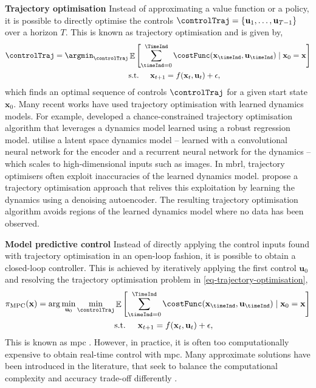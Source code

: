 \documentclass{mimosis-class/mimosis}
\numberwithin{equation}{chapter}
\DeclareMathOperator{\E}{\mathbb{E}}
\newcommand{\state}{\ensuremath{\mathbf{x}}}
\newcommand{\control}{\ensuremath{\mathbf{u}}}
\begin{document}
\textbf{Trajectory optimisation}
Instead of approximating a value function or a policy, it is possible to directly optimise the controls
\(\controlTraj = \{\control_1, \ldots, \control_{T-1} \}\) over a horizon \(T\).
This is known as trajectory optimisation and is given by,
\begin{subequations} \label{eq-trajectory-optimisation}
\begin{align}
\controlTraj =
\argmin_{\controlTraj} &\E \left[ \sum_{\timeInd=0}^{\TimeInd} \costFunc(\state_{\timeInd}, \control_{\timeInd})
\mid \state_0=\state \right] \\
&\text{s.t. } \quad \state_{t+1} = f(\state_t, \control_t) + \epsilon,
\end{align}
\end{subequations}
which finds an optimal sequence of controls \(\controlTraj\) for a given start state \(\state_0\).
Many recent works have used trajectory optimisation with learned dynamics models.
For example, \cite{nakkaChanceConstrained2021} developed a chance-constrained trajectory optimisation
algorithm that leverages a dynamics model learned using a robust regression model.
\cite{rybkinModelBased2021} utilise a latent space dynamics model -- learned
with a convolutional neural network for the encoder and a recurrent neural network for the dynamics -- which scales to high-dimensional inputs such as images.
In \acrshort{mbrl}, trajectory optimisers often exploit inaccuracies of the learned dynamics model.
\cite{boneyRegularizing2019} propose a trajectory optimisation approach that relives this exploitation by
learning the dynamics using a denoising autoencoder.
The resulting trajectory optimisation algorithm avoids regions of the learned dynamics model where no data
has been observed.

\textbf{Model predictive control}
Instead of directly applying the control inputs found with trajectory optimisation in an open-loop fashion,
it is possible to obtain a closed-loop controller.
This is achieved by iteratively applying the first control \(\control_0\) and resolving the trajectory optimisation
problem in \cref{eq-trajectory-optimisation},
\begin{subequations} \label{eq-mpc-loop}
\begin{align}
\pi_{\text{MPC}}(\state) =
\arg \min_{\control_0}
\min_{\controlTraj} &\E \left[ \sum_{\timeInd=0}^{\TimeInd} \costFunc(\state_{\timeInd}, \control_{\timeInd})
\mid \state_0=\state \right] \\
&\text{s.t. } \quad \state_{t+1} = f(\state_t, \control_t) + \epsilon,
\end{align}
\end{subequations}
This is known as \acrfull{mpc} \citep{eduardof.Model2007}.
However, in practice, it is often too computationally expensive to obtain real-time control with \acrshort{mpc}.
Many approximate solutions have been introduced in the literature, that seek to balance the computational complexity
and accuracy trade-off differently \citep{bettsSurvey1998}.
\end{document}
